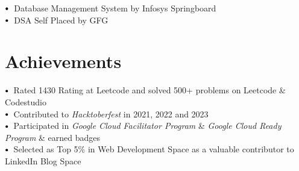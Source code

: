 \documentclass[letterpaper,11pt]{article}
\newcommand\sbullet[1][.5]{\mathbin{\vcenter{\hbox{\scalebox{#1}{$\bullet$}}}}}
\begin{document}
$\sbullet[.75] \hspace{0.1cm}$ 
{{Database Management System by Infosys Springboard}} {\href{https://drive.google.com/file/d/157A4t4jEd70He6MUfn_pGqL71G5tFLHH/view?usp=sharing}{\raisebox{-0.1\height}\faExternalLink }}
\hspace{2cm}\\

$\sbullet[.75] \hspace{0.1cm}$ 
{{DSA Self Placed by GFG}} {\href{https://drive.google.com/file/d/1tUcDkbx12nVkwR38cpsBqsf_m8_BCjLr/view?usp=sharing}{\raisebox{-0.1\height}\faExternalLink }}
\hspace{6cm}\\

\section{Achievements}

$\sbullet[.75] \hspace{0.2cm}${{Rated 1430 Rating at Leetcode and solved 500+ problems on Leetcode \& Codestudio}} {\href{https://leetcode.com/keshavop/}{\raisebox{-0.1\height}\faExternalLink }}  
\hspace{2cm}\\

$\sbullet[.75] \hspace{0.2cm}${{Contributed to \textit{Hacktoberfest} in 2021, 2022 and 2023}} {\href{https://drive.google.com/file/d/11qa8d9tDFXLJiDeccjvG6gAMsaZidgY7/view?usp=sharing}{\raisebox{-0.1\height}\faExternalLink }}
\hspace{2cm}\\

$\sbullet[.75] \hspace{0.2cm}${{Participated in \textit{Google Cloud Facilitator Program} \& \textit{Google Cloud Ready Program} \& earned badges}} {\href{https://www.cloudskillsboost.google/public_profiles/792a8b6a-c5e8-4b7f-a4b4-6245803d471c}{\raisebox{-0.1\height}\faExternalLink }}
\hspace{2cm}\\

$\sbullet[.75] \hspace{0.2cm}${{Selected as Top 5\% in Web Development Space as a valuable contributor to LinkedIn Blog Space}}
\hspace{2cm}\\

 \vspace{2pt}
\end{document}
